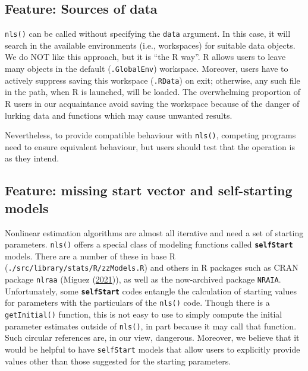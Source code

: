 \documentclass[
]{article}
\begin{document}
\hypertarget{feature-sources-of-data}{%
\subsection{Feature: Sources of data}\label{feature-sources-of-data}}

\texttt{nls()} can be called without specifying the \texttt{data}
argument. In this case, it will search in the available environments
(i.e., workspaces) for suitable data objects. We do NOT like this
approach, but it is ``the R way''. R allows users to leave many objects
in the default (\texttt{.GlobalEnv}) workspace. Moreover, users have to
actively suppress saving this workspace (\texttt{.RData}) on exit;
otherwise, any such file in the path, when R is launched, will be
loaded. The overwhelming proportion of R users in our acquaintance avoid
saving the workspace because of the danger of lurking data and functions
which may cause unwanted results.

Nevertheless, to provide compatible behaviour with \texttt{nls()},
competing programs need to ensure equivalent behaviour, but users should
test that the operation is as they intend.

\hypertarget{feature-missing-start-vector-and-self-starting-models}{%
\subsection{Feature: missing start vector and self-starting
models}\label{feature-missing-start-vector-and-self-starting-models}}

Nonlinear estimation algorithms are almost all iterative and need a set
of starting parameters. \texttt{nls()} offers a special class of
modeling functions called \textbf{\texttt{selfStart}} models. There are
a number of these in base R (\texttt{./src/library/stats/R/zzModels.R})
and others in R packages such as CRAN package \texttt{nlraa} (Miguez
(\protect\hyperlink{ref-MiguezNLRAA2021}{2021})), as well as the
now-archived package \texttt{NRAIA}. Unfortunately, some
\textbf{\texttt{selfStart}} codes entangle the calculation of starting
values for parameters with the particulars of the \texttt{nls()} code.
Though there is a \texttt{getInitial()} function, this is not easy to
use to simply compute the initial parameter estimates outside of
\texttt{nls()}, in part because it may call that function. Such circular
references are, in our view, dangerous. Moreover, we believe that it
would be helpful to have \texttt{selfStart} models that allow users to
explicitly provide values other than those suggested for the starting
parameters.
\end{document}
